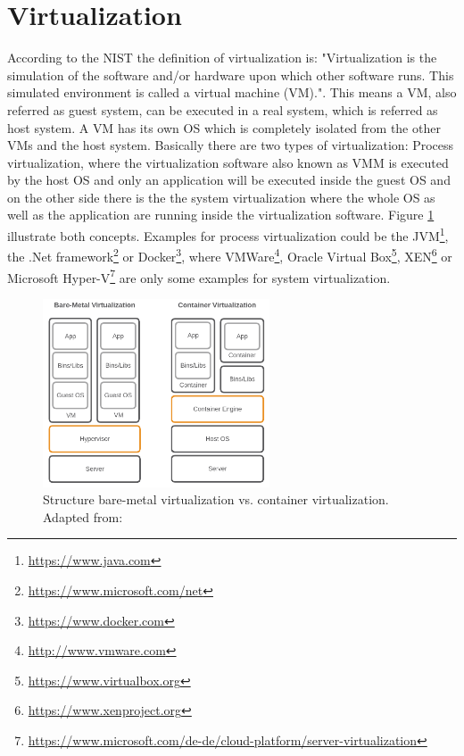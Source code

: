 \section{Virtualization}
\label{section:state_virtualization}
According to the \ac{NIST} the definition of virtualization is: "Virtualization is the simulation of the software and/or hardware upon which other software runs. This simulated environment is called a virtual machine (VM)."\autocite[p. ES-1]{Sca:2011}.
This means a \ac{VM}, also referred as guest system, can be executed in a real system, which is referred as host system.
A \ac{VM} has its own \ac{OS} which is completely isolated from the other \acp{VM} and the host system.\autocite[cf.][p. 2]{Celesti:2016}
Basically there are two types of virtualization: Process virtualization, where the virtualization software also known as \ac{VMM} is executed by the host \ac{OS} and only an application will be executed inside the guest \ac{OS} and on the other side there is the the system virtualization where the whole \ac{OS} as well as the application are running inside the virtualization software.
Figure \ref{fig:vms_vs_docker} illustrate both concepts.
Examples for process virtualization could be the \ac{JVM}\footnote{\url{https://www.java.com}}, the .Net framework\footnote{\url{https://www.microsoft.com/net}} or Docker\footnote{\url{https://www.docker.com}}, where VMWare\footnote{\url{http://www.vmware.com}}, Oracle Virtual Box\footnote{\url{https://www.virtualbox.org}}, XEN\footnote{\url{https://www.xenproject.org}} or Microsoft Hyper-V\footnote{\url{https://www.microsoft.com/de-de/cloud-platform/server-virtualization}} are only some examples for system virtualization.

\begin{figure}[H]
    \centering
    \includegraphics[width=0.6\textwidth]{resources/images/vm_vs_container.png}
    \caption[Structure bare-metal virtualization vs. container virtualization]{Structure bare-metal virtualization vs. container virtualization. Adapted from: \autocite[p. 2]{Gallagher:2015}}
    \label{fig:vms_vs_docker}
\end{figure}

